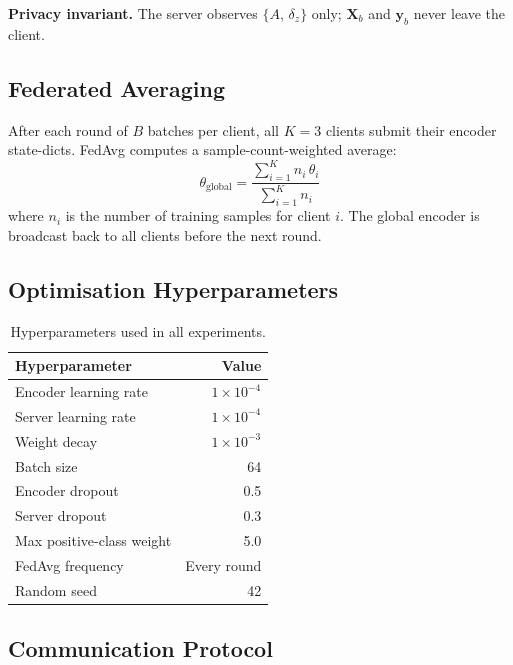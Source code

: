 \documentclass[10pt,twocolumn]{article}
\begin{document}
\textbf{Privacy invariant.}  The server observes $\{A,\,\delta_z\}$
only; $\mathbf{X}_b$ and $\mathbf{y}_b$ never leave the client.

\subsection{Federated Averaging}

After each round of $B$ batches per client, all $K=3$ clients submit
their encoder state-dicts.  FedAvg computes a sample-count-weighted
average:
\begin{equation}
\theta_{\text{global}} =
  \frac{\displaystyle\sum_{i=1}^{K} n_i\,\theta_i}
       {\displaystyle\sum_{i=1}^{K} n_i}
\label{eq:fedavg}
\end{equation}
where $n_i$ is the number of training samples for client $i$.  The
global encoder is broadcast back to all clients before the next round.

\subsection{Optimisation Hyperparameters}

\begin{table}[h]
\centering
\caption{Hyperparameters used in all experiments.}
\label{tab:hparams}
\begin{tabular}{lr}
\toprule
Hyperparameter & Value \\
\midrule
Encoder learning rate       & $1\times10^{-4}$ \\
Server learning rate        & $1\times10^{-4}$ \\
Weight decay                & $1\times10^{-3}$ \\
Batch size                  & 64 \\
Encoder dropout             & 0.5 \\
Server dropout              & 0.3 \\
Max positive-class weight   & 5.0 \\
FedAvg frequency            & Every round \\
Random seed                 & 42 \\
\bottomrule
\end{tabular}
\end{table}

\subsection{Communication Protocol}
\end{document}
